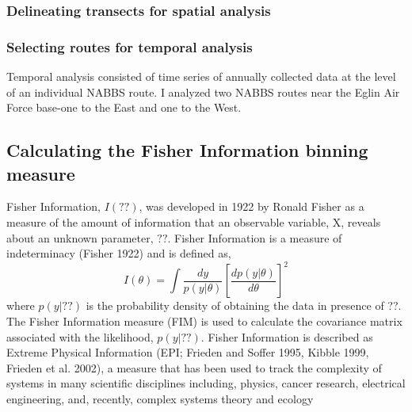 \documentclass[12pt,twoside]{reedthesis}
\begin{document}
\subsubsection{Delineating transects for spatial
analysis}\label{delineating-transects-for-spatial-analysis}

\subsubsection{Selecting routes for temporal
analysis}\label{selecting-routes-for-temporal-analysis}

Temporal analysis consisted of time series of annually collected data at
the level of an individual NABBS route. I analyzed two NABBS routes near
the Eglin Air Force base-one to the East and one to the West.

\subsection{Calculating the Fisher Information binning
measure}\label{calculating-the-fisher-information-binning-measure}

Fisher Information, \(I(??)\), was developed in 1922 by Ronald Fisher as
a measure of the amount of information that an observable variable, X,
reveals about an unknown parameter, \(??\). Fisher Information is a
measure of indeterminacy (Fisher 1922) and is defined as,
\begin{equation} 
I(\theta) = \int \frac{dy}{p(y|\theta)}\left[\frac{dp(y|\theta)}{d\theta}\right]^2
\label{eq:fiGeneral1922}
\end{equation}
where \(p(y|??)\) is the probability density of obtaining the data in
presence of ??. The Fisher Information measure (FIM) is used to
calculate the covariance matrix associated with the likelihood,
\(p(y|??)\). Fisher Information is described as Extreme Physical
Information (EPI; Frieden and Soffer 1995, Kibble 1999, Frieden et al.
2002), a measure that has been used to track the complexity of systems
in many scientific disciplines including, physics, cancer research,
electrical engineering, and, recently, complex systems theory and
ecology
\end{document}
